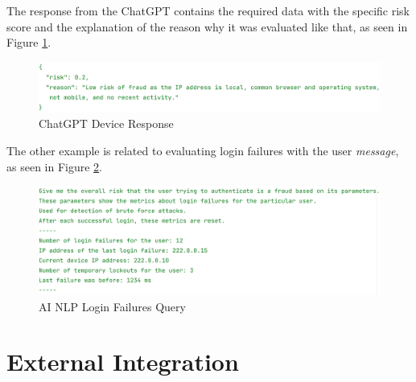 The response from the ChatGPT contains the required data with the specific risk score and the explanation of the reason why it was evaluated like that, as seen in Figure \ref{fig:impl-ai-device-message-response}.

\begin{figure}[htbp]
  \centering
  \includegraphics[width=1\textwidth]{img/sections/6-implementation/aiDeviceResponse.png}
  \caption{ChatGPT Device Response}
  \label{fig:impl-ai-device-message-response}
\end{figure}

The other example is related to evaluating login failures with the user \textit{message}, as seen in Figure \ref{fig:impl-ai-login-message}.

\begin{figure}[htbp]
  \centering
  \includegraphics[width=1\textwidth]{img/sections/6-implementation/aiLoginFailureMessage.png}
  \caption{AI NLP Login Failures Query}
  \label{fig:impl-ai-login-message}
\end{figure}


\newpage
\section{External Integration}

\shorthandoff{-}